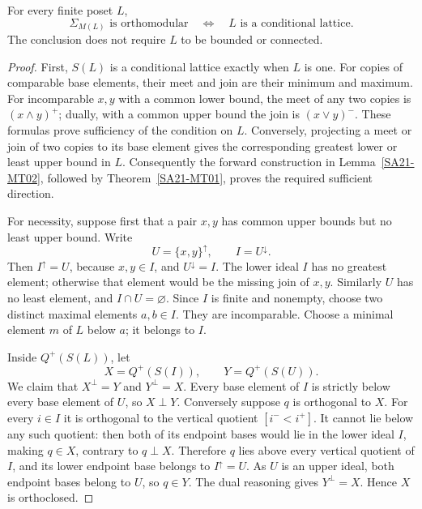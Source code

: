 \begin{theorem}
\label{SA21-MT03}
For every finite poset $L$,
\[
 \Sigma_{M(L)}\text{ is orthomodular}
 \quad\Longleftrightarrow\quad
 L\text{ is a conditional lattice}.
\]
The conclusion does not require $L$ to be bounded or connected.
\end{theorem}
\begin{proof}
First, $S(L)$ is a conditional lattice exactly when $L$ is one.
For copies of comparable base elements, their meet and join are their
minimum and maximum. For incomparable $x,y$ with a common lower
bound, the meet of any two copies is $(x\wedge y)^+$; dually, with a
common upper bound the join is $(x\vee y)^-$. These formulas prove
sufficiency of the condition on $L$. Conversely, projecting a meet or
join of two copies to its base element gives the corresponding
greatest lower or least upper bound in $L$. Consequently the forward
construction in Lemma~\ref{SA21-MT02}, followed by
Theorem~\ref{SA21-MT01}, proves the required sufficient direction.

For necessity, suppose first that a pair $x,y$ has common upper
bounds but no least upper bound. Write
\[
 U=\{x,y\}^{\uparrow},\qquad I=U^{\downarrow}.
\]
Then $I^{\uparrow}=U$, because $x,y\in I$, and $U^{\downarrow}=I$.
The lower ideal $I$ has no greatest element; otherwise that element
would be the missing join of $x,y$. Similarly $U$ has no least
element, and $I\cap U=\varnothing$. Since $I$ is finite and nonempty,
choose two distinct maximal elements $a,b\in I$. They are incomparable.
Choose a minimal element $m$ of $L$ below $a$; it belongs to $I$.

Inside $Q^+(S(L))$, let
\[
 X=Q^+(S(I)),\qquad Y=Q^+(S(U)).
\]
We claim that $X^{\perp}=Y$ and $Y^{\perp}=X$. Every base element
of $I$ is strictly below every base element of $U$, so $X\perp Y$.
Conversely suppose $q$ is orthogonal to $X$. For every $i\in I$
it is orthogonal to the vertical quotient $[i^-<i^+]$.
It cannot lie below any such quotient: then both of its endpoint
bases would lie in the lower ideal $I$, making $q\in X$, contrary
to $q\perp X$. Therefore $q$ lies above every vertical quotient of
$I$, and its lower endpoint base belongs to $I^{\uparrow}=U$.
As $U$ is an upper ideal, both endpoint bases belong to $U$, so
$q\in Y$. The dual reasoning gives $Y^{\perp}=X$. Hence $X$ is
orthoclosed.


\end{proof}
